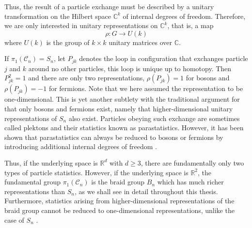 \documentclass[a4paper,10pt,oneside]{book}
\theoremstyle{plain}
\theoremstyle{definition}
\theoremstyle{remark}
\begin{document}
Thus, the result of a particle exchange must be described by a unitary transformation on the Hilbert space $\mathbb{C}^k$ of internal degrees of freedom. Therefore, we are only interested in unitary representations on $\mathbb{C}^k$, that is, a map
\begin{equation}
  \rho : G \to U(k)
\end{equation}
where $U(k)$ is the group of $k \times k$ unitary matrices over $\mathbb{C}$.

If $π_1(\mathcal{C}_n) = S_n$, let $P_{jk}$ denotes the loop in configuration that exchanges particle $j$ and $k$ around no other particles, this loop is unique up to homotopy. Then $P_{jk}^2 = 1$ and there are only two representations, $\rho(P_{jk}) = 1$ for bosons and $\rho(P_{jk}) = -1$ for fermions. Note that we here assumed the representation to be one-dimensional. This is yet another subtlety with the traditional argument for that only bosons and fermions exist, namely that higher-dimensional unitary representations of $S_n$ also exist. Particles obeying such exchange are sometimes called plektons and their statistics known as parastatistics. However, it has been shown that parastatistics can always be reduced to bosons or fermions by introducing additional internal degrees of freedom \cite{fröhlich}.

Thus, if the underlying space is $\mathbb{R}^d$ with $d\ge 3$, there are fundamentally only two types of particle statistics. However, if the underlying space is $\mathbb{R}^2$, the fundamental group $π_1(\mathcal{C}_n)$ is the braid group $B_n$ which has much richer representations than $S_n$, as we shall see in detail throughout this thesis. Furthermore, statistics arising from higher-dimensional representations of the braid group cannot be reduced to one-dimensional representations, unlike the case of $S_n$ \cite{fröhlich}.
\end{document}
